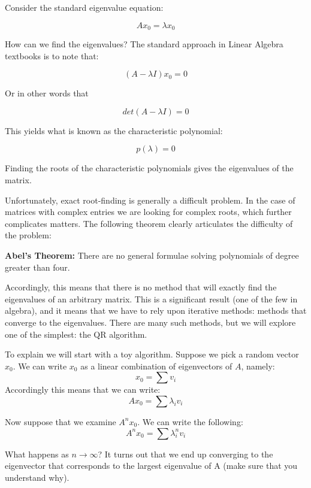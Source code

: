 \label{Ch:EigSolve}


Consider the standard eigenvalue equation:

\[
A x_0 = \lambda x_0
\]

How can we find the eigenvalues? The standard approach in Linear Algebra textbooks is to note that:

\[
(A-\lambda I)x_0 = 0
\]

Or in other words that

\[
det(A-\lambda I) = 0
\]

This yields what is known as the characteristic polynomial:

\[
p(\lambda) = 0
\]

Finding the roots of the characteristic polynomials gives the eigenvalues of the matrix.

Unfortunately, exact root-finding is generally a difficult problem. In the case of matrices with complex entries we are looking for complex roots, which further complicates matters. The following theorem clearly articulates the difficulty of the problem:

\begin{theorem}
{\bf Abel's Theorem:} There are no general formulae solving polynomials of degree greater than four.
\end{theorem}

Accordingly, this means that there is no method that will exactly find the eigenvalues of an arbitrary matrix. This is a significant result (one of the few in algebra), and it means that we have to rely upon iterative methods: methods that converge to the eigenvalues. There are many such methods, but we will explore one of the simplest: the QR algorithm.

To explain we will start with a toy algorithm. Suppose we pick a random vector $x_0$. We can write $x_0$ as a linear combination of eigenvectors of $A$, namely:
\[
x_0 = \sum v_i
\]
Accordingly this means that we can write:
\[
Ax_0 = \sum \lambda_i v_i
\]

Now suppose that we examine $A^n x_0$. We can write the following:
\[
A^n x_0 = \sum \lambda_i^n v_i
\]

What happens as $n \rightarrow \infty$? It turns out that we end up converging to the eigenvector that corresponds to the largest eigenvalue of A (make sure that you understand why).

